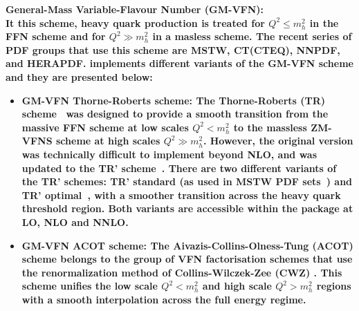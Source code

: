\begin{description}
\item \bf{General-Mass Variable-Flavour Number (GM-VFN)}\rm \cite{VFN}:
\\
It this scheme, heavy quark production is treated for
$Q^2 \le m_h^2$ in the FFN scheme and for $Q^2 \gg m_h^2$
in a masless scheme. 
The recent series of PDF groups that use this scheme are MSTW, CT(CTEQ), NNPDF, and HERAPDF.
\fitter implements different variants of the GM-VFN scheme and they are presented below:
% 
\begin{itemize}
%
\item \bf {GM-VFN Thorne-Roberts scheme:} \rm
%
%
The Thorne-Roberts (TR) scheme~\cite{Thorne:1997ga} was designed to provide a smooth transition 
from the massive FFN scheme at low scales $Q^2 < m_h^2$ to the massless ZM-VFNS scheme at high scales $Q^2 \gg m_h^2$. 
However, the original version was technically difficult to implement beyond NLO, and was updated 
to the TR' scheme~\cite{Thorne:2006qt}.
There are two different variants of the TR' schemes: TR' standard (as used in MSTW PDF sets~\cite{Thorne:2006qt,MSTWpdf}) 
and TR' optimal~\cite{Thorne:6180}, with a smoother transition across the heavy quark threshold region. 
Both variants are accessible within the \fitter package at LO, NLO and NNLO.
\vspace{0.1cm}
\item \bf {GM-VFN ACOT scheme:} \rm
The Aivazis-Collins-Olness-Tung (ACOT) scheme belongs to the group of VFN factorisation 
schemes that use the renormalization method of Collins-Wilczek-Zee (CWZ) \cite{CWZ}.
This scheme unifies the low scale $Q^2 < m_h^2$ and high scale $Q^2 > m_h^2$ regions with a smooth interpolation across the full energy regime. 

\end{itemize}
\end{description}
